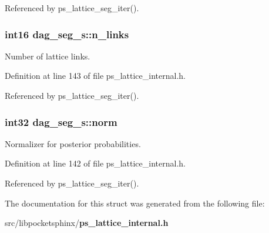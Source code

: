 Referenced by ps\+\_\+lattice\+\_\+seg\+\_\+iter().

\subsubsection[{n\+\_\+links}]{\setlength{\rightskip}{0pt plus 5cm}int16 dag\+\_\+seg\+\_\+s\+::n\+\_\+links}\label{structdag__seg__s_a2a858ea6ef051074be2bd1716a4939fb}


Number of lattice links. 



Definition at line 143 of file ps\+\_\+lattice\+\_\+internal.\+h.



Referenced by ps\+\_\+lattice\+\_\+seg\+\_\+iter().

\subsubsection[{norm}]{\setlength{\rightskip}{0pt plus 5cm}int32 dag\+\_\+seg\+\_\+s\+::norm}\label{structdag__seg__s_a4517656eeaa40d33109d39a251a75dea}


Normalizer for posterior probabilities. 



Definition at line 142 of file ps\+\_\+lattice\+\_\+internal.\+h.



Referenced by ps\+\_\+lattice\+\_\+seg\+\_\+iter().



The documentation for this struct was generated from the following file\+:\begin{DoxyCompactItemize}
\item 
src/libpocketsphinx/{\bf ps\+\_\+lattice\+\_\+internal.\+h}\end{DoxyCompactItemize}
